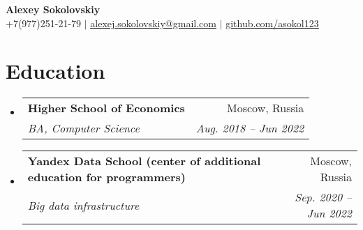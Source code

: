 \documentclass[letterpaper,11pt]{article}
\makeatletter
\newcommand{\resumeSubheading}[4]{
  \vspace{-2pt}\item
    \begin{tabular*}{0.97\textwidth}[t]{l@{\extracolsep{\fill}}r}
      \textbf{#1} & #2 \\
      \textit{\small#3} & \textit{\small #4} \\
    \end{tabular*}\vspace{-7pt}
}
\newcommand{\resumeSubHeadingListStart}{\begin{itemize}[leftmargin=0.15in, label={}]}
\newcommand{\resumeSubHeadingListEnd}{\end{itemize}}
\makeatother
\begin{document}

\begin{center}
    \textbf{\Huge Alexey Sokolovskiy} \\ \vspace{1pt}
    \small +7(977)251-21-79 $|$ \href{mailto:alexej.sokolovskiy@gmail.com}{\underline{alexej.sokolovskiy@gmail.com}} $|$ 
    \href{https://github.com/asokol123}{\underline{github.com/asokol123}}
\end{center}


\section{Education}
  \resumeSubHeadingListStart
    \resumeSubheading
      {Higher School of Economics}{Moscow, Russia}
      {BA, Computer Science}{Aug. 2018 -- Jun 2022}
    \resumeSubheading
      {Yandex Data School (center of additional education for programmers)}{Moscow, Russia}
      {Big data infrastructure}{Sep. 2020 -- Jun 2022}
  \resumeSubHeadingListEnd


\end{document}
